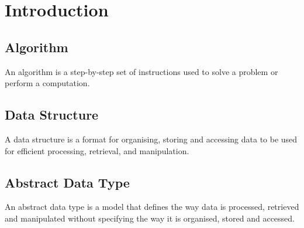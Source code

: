 \chapter{Introduction}

\section{Algorithm}

An algorithm is a step-by-step set of instructions used to solve a problem or perform a computation.

\section{Data Structure}

A data structure is a format for organising, storing and accessing data to be used for efficient processing, retrieval, and manipulation.

\section{Abstract Data Type}

An abstract data type is a model that defines the way data is processed, retrieved and manipulated without specifying the way it is organised, stored and accessed.
